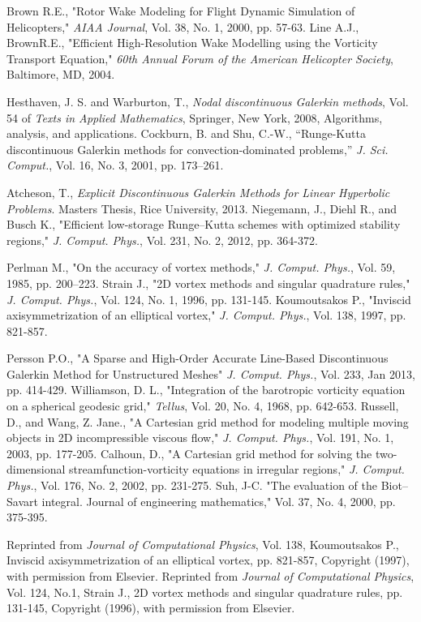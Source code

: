 \documentclass[]{aiaa-tc}%
\begin{document}
\begin{thebibliography}{9}
Brown R.E., "Rotor Wake Modeling for Flight Dynamic Simulation of Helicopters," \textit{AIAA Journal}, Vol. 38, No. 1, 2000, pp. 57-63.
Line A.J., BrownR.E., "Efficient High-Resolution Wake Modelling using the Vorticity Transport Equation," \textit{60th Annual Forum of the American Helicopter Society}, Baltimore, MD, 2004.

Hesthaven, J. S. and Warburton, T., \textit{Nodal discontinuous Galerkin methods}, Vol. 54 of \textit{Texts in Applied Mathematics}, Springer, New York, 2008, Algorithms, analysis, and applications.
Cockburn, B. and Shu, C.-W., “Runge-Kutta discontinuous Galerkin methods for convection-dominated problems,” \textit{J. Sci. Comput.}, Vol. 16, No. 3, 2001, pp. 173–261.

Atcheson, T., \textit{Explicit Discontinuous Galerkin Methods for Linear Hyperbolic Problems}. Masters Thesis, Rice University, 2013.
Niegemann, J., Diehl R., and Busch K., "Efficient low-storage Runge–Kutta schemes with optimized stability regions," \textit{J. Comput. Phys.}, Vol. 231, No. 2, 2012, pp. 364-372.

Perlman M., "On the accuracy of vortex methods," \textit{J. Comput. Phys.}, Vol. 59, 1985, pp. 200–223.
Strain J., "2D vortex methods and singular quadrature rules," \textit{J. Comput. Phys.}, Vol. 124, No. 1, 1996, pp. 131-145.
Koumoutsakos P., "Inviscid axisymmetrization of an elliptical vortex," \textit{J. Comput. Phys.}, Vol. 138, 1997, pp. 821-857.

Persson P.O., "A Sparse and High-Order Accurate Line-Based Discontinuous Galerkin Method for Unstructured Meshes" \textit{J. Comput. Phys.}, Vol. 233, Jan 2013, pp. 414-429.
Williamson, D. L., "Integration of the barotropic vorticity equation on a spherical geodesic grid," \textit{Tellus}, Vol. 20, No. 4, 1968, pp. 642-653.
Russell, D., and Wang, Z. Jane., "A Cartesian grid method for modeling multiple moving objects in 2D incompressible viscous flow," \textit{J. Comput. Phys.}, Vol. 191, No. 1, 2003, pp. 177-205.
Calhoun, D., "A Cartesian grid method for solving the two-dimensional streamfunction-vorticity equations in irregular regions," \textit{J. Comput. Phys.}, Vol. 176, No. 2, 2002, pp. 231-275.
Suh, J-C. "The evaluation of the Biot–Savart integral. Journal of engineering mathematics," Vol. 37, No. 4, 2000, pp. 375-395.

Reprinted from \textit{Journal of Computational Physics}, Vol. 138, Koumoutsakos P., Inviscid axisymmetrization of an elliptical vortex, pp. 821-857, Copyright (1997), with permission from Elsevier.
Reprinted from \textit{Journal of Computational Physics}, Vol. 124, No.1, Strain J., 2D vortex methods and singular quadrature rules, pp. 131-145, Copyright (1996), with permission from Elsevier.
\end{thebibliography}
\end{document}
